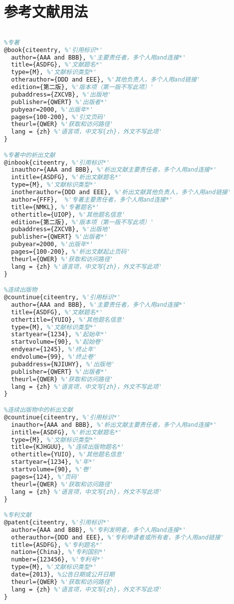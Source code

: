\section{参考文献用法}
\begin{lstlisting}[language=tex,escapeinside='']
%'下面提到的项，带*的是必有的，其他的选填'

%专著
@book{citeentry, %'引用标识*'
  author={AAA and BBB}, %'主要责任者，多个人用and连接*'
  title={ASDFG}, %'文献题名*'
  type={M}, %'文献标识类型*'
  otherauthor={DDD and EEE}, %'其他负责人，多个人用and链接'
  edition={第二版}, %'版本项（第一版不写此项）'
  pubaddress={ZXCVB}, %'出版地'
  publisher={QWERT} %'出版者*'
  pubyear=2000, %'出版年*'
  pages={100-200}, %'引文页码'
  theurl={QWER} %'获取和访问路径'
  lang = {zh} %'语言项，中文写{zh}，外文不写此项'
}

%专著中的析出文献
@inbook{citeentry, %'引用标识*'
  inauthor={AAA and BBB}, %'析出文献主要责任者，多个人用and连接*'
  intitle={ASDFG}, %'析出文献题名*'
  type={M}, %'文献标识类型*'
  inotherauthor={DDD and EEE}, %'析出文献其他负责人，多个人用and链接'
  author={FFF},  %'专著主要责任者，多个人用and连接*'
  title={NMKL}, %'专著题名*'
  othertitle={UIOP}, %'其他题名信息'
  edition={第二版}, %'版本项（第一版不写此项）'
  pubaddress={ZXCVB}, %'出版地'
  publisher={QWERT} %'出版者*'
  pubyear=2000, %'出版年*'
  pages={100-200}, %'析出文献起止页码'
  theurl={QWER} %'获取和访问路径'
  lang = {zh} %'语言项，中文写{zh}，外文不写此项'
}

%连续出版物
@countinue{citeentry, %'引用标识*'
  author={AAA and BBB}, %'主要责任者，多个人用and连接*'
  title={ASDFG}, %'文献题名*'
  othertitle={YUIO}, %'其他题名信息'
  type={M}, %'文献标识类型*'
  startyear={1234}, %'起始年*'
  startvolume={90}, %'起始卷'
  endyear={1245}, %'终止年'
  endvolume={99}, %'终止卷'
  pubaddress={NJIUHY}, %'出版地'
  publisher={QWERT} %'出版者*'
  theurl={QWER} %'获取和访问路径'
  lang = {zh} %'语言项，中文写{zh}，外文不写此项'
}

%连续出版物中的析出文献
@countinue{citeentry, %'引用标识*'
  inauthor={AAA and BBB}, %'析出文献主要责任者，多个人用and连接*'
  intitle={ASDFG}, %'析出文献题名*'
  type={M}, %'文献标识类型*'
  title={KJHGUU}, %'连续出版物题名*'
  othertitle={YUIO}, %'其他题名信息'
  startyear={1234}, %'年*'
  startvolume={90}, %'卷'
  pages={124}, %'页码'
  theurl={QWER} %'获取和访问路径'
  lang = {zh} %'语言项，中文写{zh}，外文不写此项'
}

%专利文献
@patent{citeentry, %'引用标识*'
  author={AAA and BBB}, %'专利发明者，多个人用and连接*'
  otherauthor={DDD and EEE}, %'专利申请者或所有者，多个人用and链接'
  title={ASDFG}, %'专利题名*'
  nation={China}, %'专利国别*'
  number={123456}, %'专利号*'
  type={M}, %'文献标识类型*'
  date={2013}, %公告日期或公开日期
  theurl={QWER} %'获取和访问路径'
  lang = {zh} %'语言项，中文写{zh}，外文不写此项'
}


\end{lstlisting}
